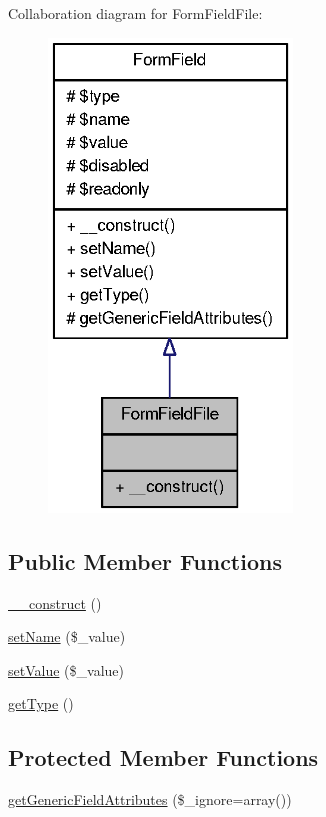 Collaboration diagram for FormFieldFile:\nopagebreak
\begin{figure}[H]
\begin{center}
\leavevmode
\includegraphics[width=184pt]{classFormFieldFile__coll__graph}
\end{center}
\end{figure}
\subsection*{Public Member Functions}
\begin{DoxyCompactItemize}
\item 
\hyperlink{classFormFieldFile_a2e19b30454dd3ed054772868bf6eebad}{\_\-\_\-construct} ()
\item 
\hyperlink{classFormField_ad57e32bd53170af060e869b3b60f0ef7}{setName} (\$\_\-value)
\item 
\hyperlink{classFormField_a465ff61e290d82be96bb793c3a14b3e7}{setValue} (\$\_\-value)
\item 
\hyperlink{classFormField_a1f64b737bccb6b2827f8c5665b9920c7}{getType} ()
\end{DoxyCompactItemize}
\subsection*{Protected Member Functions}
\begin{DoxyCompactItemize}
\item 
\hyperlink{classFormField_a9f9d136ba8b4a793f22370aff43d592d}{getGenericFieldAttributes} (\$\_\-ignore=array())
\end{DoxyCompactItemize}
